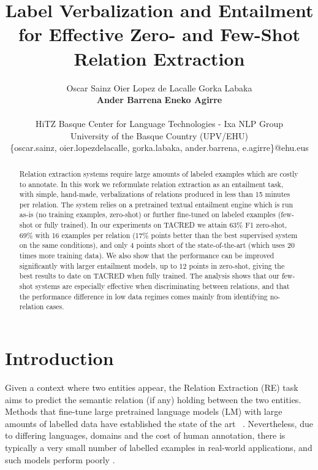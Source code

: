 \documentclass[11pt]{article}
\title{Label Verbalization and Entailment\\for Effective Zero- and Few-Shot Relation Extraction}
\author{Oscar Sainz \hspace{15pt} Oier Lopez de Lacalle \hspace{15pt} Gorka Labaka \\ {\bf Ander Barrena} \hspace{15pt} {\bf Eneko Agirre} \\ \\
HiTZ Basque Center for Language Technologies - Ixa NLP Group\\
University of the Basque Country (UPV/EHU)\\
\{oscar.sainz, oier.lopezdelacalle, gorka.labaka, ander.barrena, e.agirre\}@ehu.eus
}
\begin{document}
\maketitle
\begin{abstract}
Relation extraction systems require large amounts of labeled examples which are costly to annotate.
In this work we reformulate relation extraction as an entailment task, with simple, hand-made, verbalizations of relations produced in less than 15 minutes per relation. 
The system relies on a pretrained textual entailment engine which is run as-is (no training examples, zero-shot) or further fine-tuned on labeled examples (few-shot or fully trained). 
In our experiments on TACRED we attain 63\% F1 zero-shot, 69\% with 16 examples per relation (17\% points better than the best supervised system on the same conditions), and only 4 points short of the state-of-the-art (which uses 20 times more training data).
We also show that the performance can be improved significantly with larger entailment models, up to 12 points in zero-shot, giving the best results to date on TACRED when fully trained. 
The analysis shows that our few-shot systems are especially effective when discriminating between relations, and that the performance difference in low data regimes comes mainly from identifying no-relation cases.
\end{abstract}


\section{Introduction}





Given a context where two entities appear, the Relation Extraction (RE) task aims to predict the semantic relation (if any) holding between the two entities. Methods that fine-tune large pretrained language models (LM) with large amounts of labelled data have  established the state of the art ~\cite{yamada-etal-2020-luke}. Nevertheless, due to differing languages, domains and the cost of human annotation,  there is typically a very small number of labelled examples in real-world  applications, and such models perform poorly \cite{schick-schutze-2021-exploiting}. 
\end{document}
